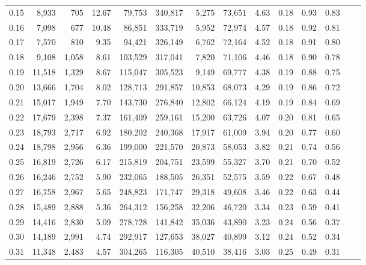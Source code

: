 \begin{tabular}{rrrrrrrrrrrrrr}
0.15 &   8,933 &    705 &   12.67 &   79,753 &  340,817 &   5,275 &  73,651 &  4.63 &  0.18 &  0.93 &      0.83 \\
0.16 &   7,098 &    677 &   10.48 &   86,851 &  333,719 &   5,952 &  72,974 &  4.57 &  0.18 &  0.92 &      0.81 \\
0.17 &   7,570 &    810 &    9.35 &   94,421 &  326,149 &   6,762 &  72,164 &  4.52 &  0.18 &  0.91 &      0.80 \\
0.18 &   9,108 &  1,058 &    8.61 &  103,529 &  317,041 &   7,820 &  71,106 &  4.46 &  0.18 &  0.90 &      0.78 \\
0.19 &  11,518 &  1,329 &    8.67 &  115,047 &  305,523 &   9,149 &  69,777 &  4.38 &  0.19 &  0.88 &      0.75 \\
0.20 &  13,666 &  1,704 &    8.02 &  128,713 &  291,857 &  10,853 &  68,073 &  4.29 &  0.19 &  0.86 &      0.72 \\
0.21 &  15,017 &  1,949 &    7.70 &  143,730 &  276,840 &  12,802 &  66,124 &  4.19 &  0.19 &  0.84 &      0.69 \\
0.22 &  17,679 &  2,398 &    7.37 &  161,409 &  259,161 &  15,200 &  63,726 &  4.07 &  0.20 &  0.81 &      0.65 \\
0.23 &  18,793 &  2,717 &    6.92 &  180,202 &  240,368 &  17,917 &  61,009 &  3.94 &  0.20 &  0.77 &      0.60 \\
0.24 &  18,798 &  2,956 &    6.36 &  199,000 &  221,570 &  20,873 &  58,053 &  3.82 &  0.21 &  0.74 &      0.56 \\
0.25 &  16,819 &  2,726 &    6.17 &  215,819 &  204,751 &  23,599 &  55,327 &  3.70 &  0.21 &  0.70 &      0.52 \\
0.26 &  16,246 &  2,752 &    5.90 &  232,065 &  188,505 &  26,351 &  52,575 &  3.59 &  0.22 &  0.67 &      0.48 \\
0.27 &  16,758 &  2,967 &    5.65 &  248,823 &  171,747 &  29,318 &  49,608 &  3.46 &  0.22 &  0.63 &      0.44 \\
0.28 &  15,489 &  2,888 &    5.36 &  264,312 &  156,258 &  32,206 &  46,720 &  3.34 &  0.23 &  0.59 &      0.41 \\
0.29 &  14,416 &  2,830 &    5.09 &  278,728 &  141,842 &  35,036 &  43,890 &  3.23 &  0.24 &  0.56 &      0.37 \\
0.30 &  14,189 &  2,991 &    4.74 &  292,917 &  127,653 &  38,027 &  40,899 &  3.12 &  0.24 &  0.52 &      0.34 \\
0.31 &  11,348 &  2,483 &    4.57 &  304,265 &  116,305 &  40,510 &  38,416 &  3.03 &  0.25 &  0.49 &      0.31 \\

\end{tabular}
